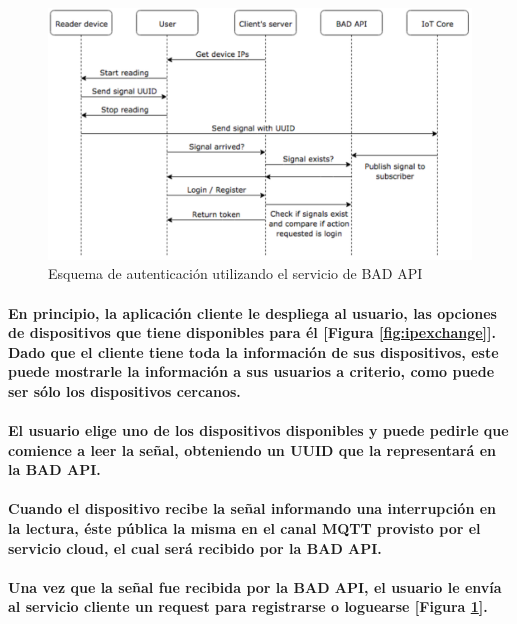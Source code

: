 \documentclass{article}
\begin{document}
\begin{figure}[ht]
    \centering
    \includegraphics[width=\textwidth]{authschema.png}%
    \caption{Esquema de autenticación utilizando el servicio de BAD API}
    \label{fig:authschema}
\end{figure}

\paragraph{
En principio, la aplicación cliente le despliega al usuario, las opciones de dispositivos que tiene disponibles para él [Figura \ref{fig:ipexchange}]. Dado que el cliente tiene toda la información de sus dispositivos, este puede mostrarle la información a sus usuarios a criterio, como puede ser sólo los dispositivos cercanos.
}
\paragraph{
El usuario elige uno de los dispositivos disponibles y puede pedirle que comience a leer la señal, obteniendo un UUID que la representará en la BAD API.
}
\paragraph{
Cuando el dispositivo recibe la señal informando una interrupción en la lectura, éste pública la misma en el canal MQTT provisto por el servicio cloud, el cual será recibido por la BAD API.
}
\paragraph{
Una vez que la señal fue recibida por la BAD API, el usuario le envía al servicio cliente un request para registrarse o loguearse [Figura \ref{fig:authschema}].
}
\end{document}
